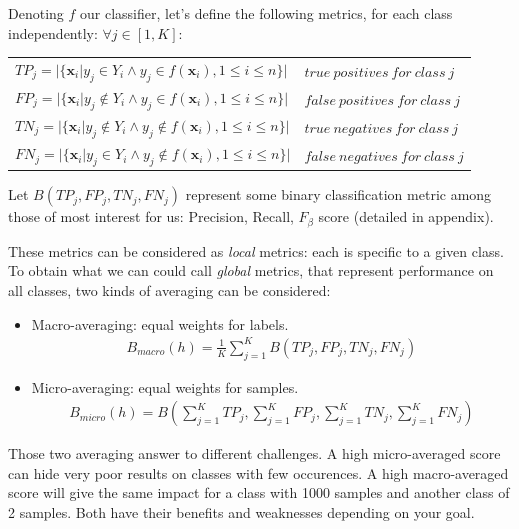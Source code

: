 Denoting $f$ our classifier, let's define the following metrics, for each class independently:
$\forall j \in [1, K]$:
{\ttfamily
\begin{table}[H]
    \centering
    \begin{tabular}{ll}
        \toprule
        $TP_j = |\{ \mathbf{x}_i | y_j \in Y_i \wedge y_j \in f(\mathbf{x}_i), 1 \leq i \leq n \}|$          &    $true\ positives\ for\ class\ j$ \\
        $FP_j = |\{ \mathbf{x}_i | y_j \notin Y_i \wedge y_j \in f(\mathbf{x}_i), 1 \leq i \leq n \}|$          &    $false\ positives\ for\ class\ j$ \\
        $TN_j = |\{ \mathbf{x}_i | y_j \notin Y_i \wedge y_j \notin f(\mathbf{x}_i), 1 \leq i \leq n \}|$       &    $true\ negatives\ for\ class\ j$  \\
        $FN_j = |\{ \mathbf{x}_i | y_j \in Y_i \wedge y_j \notin f(\mathbf{x}_i), 1 \leq i \leq n \}|$       &    $false\ negatives\ for\ class\ j$  \\
        \bottomrule
    \end{tabular}
\end{table}
}

Let $B(TP_j, FP_j, TN_j, FN_j)$ represent some binary classification metric among those of most interest for us: Precision, Recall, $F_{\beta}$ score (detailed in appendix). 

These metrics can be considered as \textit{local} metrics: each is specific to a given class. To obtain what we can could call \textit{global} metrics, that represent performance on all classes, two kinds of averaging can be considered:

\begin{itemize}
	\item Macro-averaging: equal weights for labels.
	\begin{align}
		B_{macro}(h) = \frac{1}{K}\sum_{j=1}^K B(TP_j, FP_j, TN_j, FN_j)
	\end{align}
	\item Micro-averaging: equal weights for samples.
	\begin{align}
		B_{micro}(h) = B(\sum_{j=1}^K TP_j, \sum_{j=1}^K FP_j,\sum_{j=1}^K  TN_j,\sum_{j=1}^K  FN_j)
	\end{align}
\end{itemize}


Those two averaging answer to different challenges. A high micro-averaged score can hide very poor results on classes with few occurences. A high macro-averaged score will give the same impact for a class with 1000 samples and another class of 2 samples. Both have their benefits and weaknesses depending on your goal.


